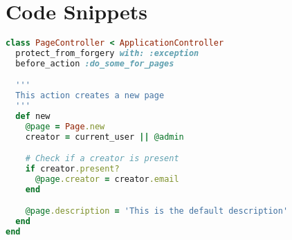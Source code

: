 \documentclass[12pt,a4paper]{article}
\begin{document}
\section{\textcolor{CtpSky}{Code Snippets}}

\begin{lstlisting}[language=Ruby,style=ruby_on_rails, caption={A ruby on rails code sample}]
class PageController < ApplicationController
  protect_from_forgery with: :exception
  before_action :do_some_for_pages

  '''
  This action creates a new page
  '''
  def new
    @page = Page.new
    creator = current_user || @admin

    # Check if a creator is present
    if creator.present?
      @page.creator = creator.email
    end

    @page.description = 'This is the default description'
  end
end
\end{lstlisting}
\end{document}

